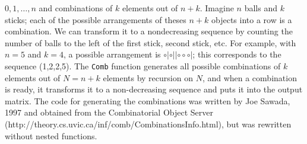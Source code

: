 \documentclass[reqno]{amsart}
\begin{document}
$0,1,\dots, n$ and combinations of $k$ elements out of $n+k$. Imagine $n$ balls and
$k$ sticks; each of the possible arrangements of theses $n+k$ objects into a row 
is a combination. We can transform it to a nondecreasing sequence by counting the
number of balls to the left of the first stick, second stick, etc. For example,
with $n=5$ and $k=4$, a possible arrangement is $\circ | \circ ||\circ\circ\circ|$; 
this corresponds to the sequence (1,2,2,5). The \texttt{Comb} function generates
all possible combinations of $k$ elements out of $N=n+k$ elements by recursion
on $N$, and when a combination is ready, it transforms it to a non-decreasing
sequence and puts it into the output matrix. The code for generating the combinations
was written by  Joe Sawada, 1997  and obtained from the Combinatorial Object
Server (http://theory.cs.uvic.ca/inf/comb/CombinationsInfo.html), but was rewritten
without nested functions.
\end{document}
